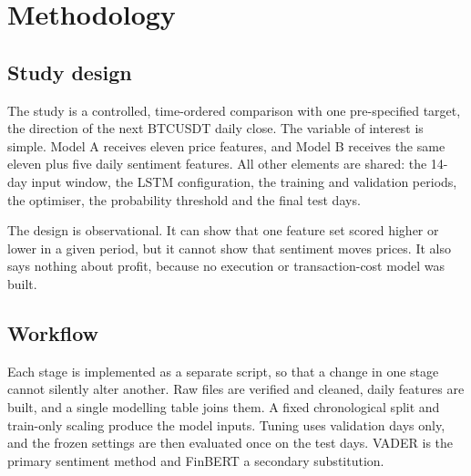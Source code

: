 \section{Methodology}
\label{ch:methods}
\subsection{Study design}
The study is a controlled, time-ordered comparison with one pre-specified target, the direction of the next BTCUSDT daily close. The variable of interest is simple. Model A receives eleven price features, and Model B receives the same eleven plus five daily sentiment features. All other elements are shared: the 14-day input window, the LSTM configuration, the training and validation periods, the optimiser, the probability threshold and the final test days.

The design is observational. It can show that one feature set scored higher or lower in a given period, but it cannot show that sentiment moves prices. It also says nothing about profit, because no execution or transaction-cost model was built.

\subsection{Workflow}
Each stage is implemented as a separate script, so that a change in one stage cannot silently alter another. Raw files are verified and cleaned, daily features are built, and a single modelling table joins them. A fixed chronological split and train-only scaling produce the model inputs. Tuning uses validation days only, and the frozen settings are then evaluated once on the test days. VADER is the primary sentiment method and FinBERT a secondary substitution.

